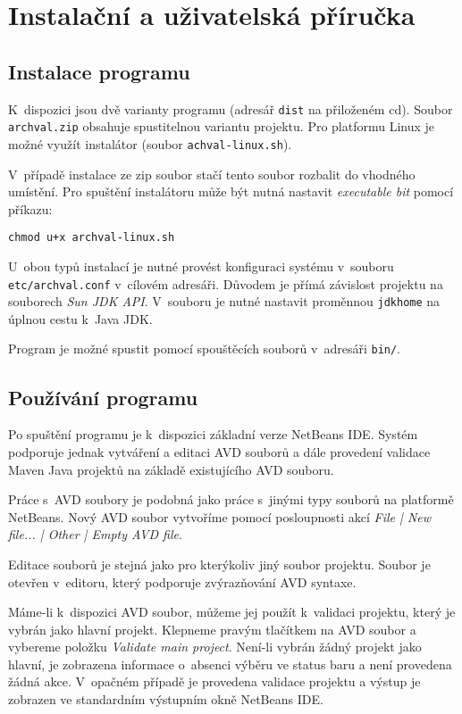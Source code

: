 \chapter{Instalační a uživatelská příručka}

\section{Instalace programu}

K~dispozici jsou dvě varianty programu (adresář \verb+dist+ na přiloženém cd). Soubor \verb+archval.zip+ obsahuje spustitelnou variantu projektu. Pro platformu Linux je možné využít instalátor (soubor \verb+achval-linux.sh+).

V~případě instalace ze zip soubor stačí tento soubor rozbalit do vhodného umístění. Pro spuštění instalátoru může být nutná nastavit \emph{executable bit} pomocí příkazu:

\begin{verbatim}
chmod u+x archval-linux.sh
\end{verbatim}

U~obou typů instalací je nutné provést konfiguraci systému v~souboru \verb+etc/archval.conf+ v~cílovém adresáři. Důvodem je přímá závislost projektu na souborech \emph{Sun JDK API}. V~souboru je nutné nastavit proměnnou \verb+jdkhome+ na úplnou cestu k~Java JDK.

Program je možné spustit pomocí spouštěcích souborů v~adresáři \verb+bin/+.

\section{Používání programu}
Po spuštění programu je k~dispozici základní verze NetBeans IDE. Systém podporuje jednak vytváření a editaci AVD souborů a dále provedení validace Maven Java projektů na základě existujícího AVD souboru.

Práce s~AVD soubory je podobná jako práce s~jinými typy souborů na platformě NetBeans. Nový AVD soubor vytvoříme pomocí posloupnosti akcí \emph{File | New file... | Other | Empty AVD file}.

Editace souborů je stejná jako pro kterýkoliv jiný soubor projektu. Soubor je otevřen v~editoru, který podporuje zvýrazňování AVD syntaxe.

Máme-li k~dispozici AVD soubor, můžeme jej použít k~validaci projektu, který je vybrán jako hlavní projekt. Klepneme pravým tlačítkem na AVD soubor a vybereme položku \emph{Validate main project}. Není-li vybrán žádný projekt jako hlavní, je zobrazena informace o~absenci výběru ve status baru a není provedena žádná akce. V~opačném případě je provedena validace projektu a výstup je zobrazen ve standardním výstupním okně NetBeans IDE.

